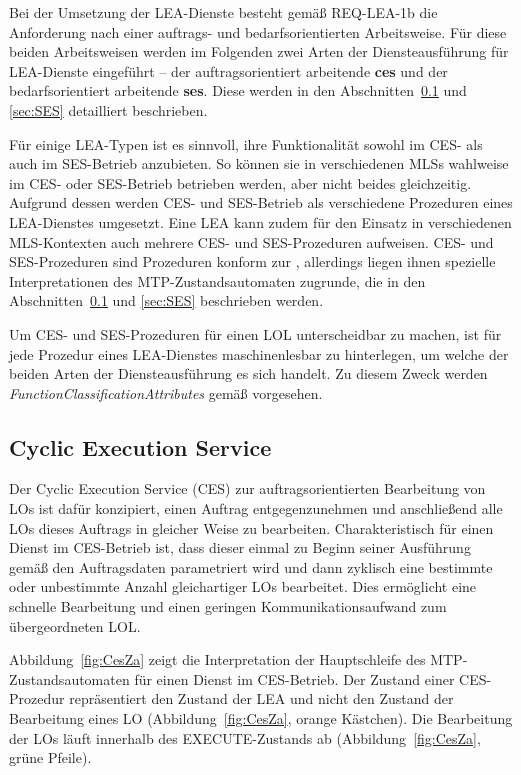 Bei der Umsetzung der LEA-Dienste besteht gemäß REQ-LEA-1b die Anforderung nach einer auftrags- und bedarfsorientierten Arbeitsweise. Für diese beiden Arbeitsweisen werden im Folgenden zwei Arten der Diensteausführung für LEA-Dienste eingeführt -- der auftragsorientiert arbeitende \textbf{\gls{ces}} und der bedarfsorientiert arbeitende \textbf{\gls{ses}}. Diese werden in den Abschnitten~\ref{sec:CES} und \ref{sec:SES} detailliert beschrieben.

Für einige LEA-Typen ist es sinnvoll, ihre Funktionalität sowohl im CES- als auch im SES-Betrieb anzubieten. So können sie in verschiedenen MLSs wahlweise im CES- oder SES-Betrieb betrieben werden, aber nicht beides gleichzeitig. Aufgrund dessen werden CES- und SES-Betrieb als verschiedene Prozeduren eines LEA-Dienstes umgesetzt. Eine LEA kann zudem für den Einsatz in verschiedenen MLS-Kontexten auch mehrere CES- und SES-Prozeduren aufweisen. CES- und SES-Prozeduren sind Prozeduren konform zur \cite{PNO.2025.Part4}, allerdings liegen ihnen spezielle Interpretationen des MTP-Zustandsautomaten zugrunde, die in den Abschnitten~\ref{sec:CES} und \ref{sec:SES} beschrieben werden. 

Um CES- und SES-Prozeduren für einen LOL unterscheidbar zu machen, ist für jede Prozedur eines LEA-Dienstes maschinenlesbar zu hinterlegen, um welche der beiden Arten der Diensteausführung es sich handelt. Zu diesem Zweck werden \emph{FunctionClassificationAttributes} gemäß \cite{PNO.2025.Part4} vorgesehen. 

\subsection{Cyclic Execution Service}
\label{sec:CES}

Der Cyclic Execution Service (CES) zur auftragsorientierten Bearbeitung von LOs ist dafür konzipiert, einen Auftrag entgegenzunehmen und anschließend alle LOs dieses Auftrags in gleicher Weise zu bearbeiten. Charakteristisch für einen Dienst im CES-Betrieb ist, dass dieser einmal zu Beginn seiner Ausführung gemäß den Auftragsdaten parametriert wird und dann zyklisch eine bestimmte oder unbestimmte Anzahl gleichartiger LOs bearbeitet. Dies ermöglicht eine schnelle Bearbeitung und einen geringen Kommunikationsaufwand zum übergeordneten LOL.

Abbildung~\ref{fig:CesZa} zeigt die Interpretation der Hauptschleife des MTP-Zu\-stands\-auto\-ma\-ten für einen Dienst im CES-Betrieb. Der Zustand einer CES-Prozedur re\-prä\-sen\-tiert den Zustand der LEA und nicht den Zustand der Bearbeitung eines LO (Abbildung~\ref{fig:CesZa}, orange Kästchen). Die Bearbeitung der LOs läuft innerhalb des EXE\-CU\-TE-Zu\-stands ab (Abbildung~\ref{fig:CesZa}, grüne Pfeile). 

